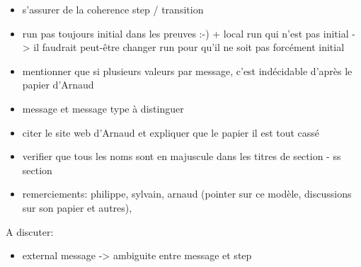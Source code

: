 \begin{itemize}
	\item s'assurer de la coherence step / transition
    \item run pas toujours initial dans les preuves :-) + local run qui n'est pas initial -> il faudrait peut-être changer run pour qu'il ne soit pas forcément initial
    \item mentionner que si plusieurs valeurs par message, c'est indécidable d'après le papier d'Arnaud
    \item message et message type à distinguer 
    \item citer le site web d'Arnaud et expliquer que le papier il est tout cassé
    \item verifier que tous les noms sont en majuscule dans les titres de section - ss section
    \item remerciements: philippe, sylvain, arnaud (pointer sur ce modèle, discussions sur son papier et autres), 
\end{itemize}

A discuter:
\begin{itemize}
\item external message -> ambiguite entre message et step 
\end{itemize}